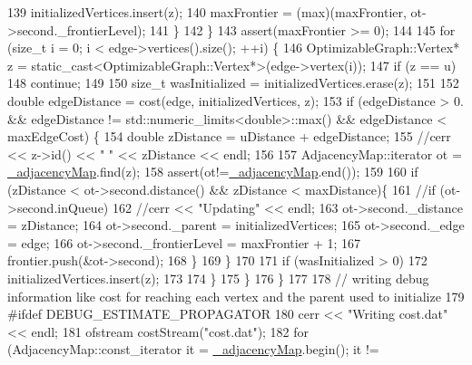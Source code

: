 \begin{DoxyCode}
139             initializedVertices.insert(z);
140             maxFrontier = (max)(maxFrontier, ot->second.\_frontierLevel);
141           \}
142         \}
143         assert(maxFrontier >= 0);
144 
145         \textcolor{keywordflow}{for} (\textcolor{keywordtype}{size\_t} i = 0; i < edge->vertices().size(); ++i) \{
146           OptimizableGraph::Vertex* z = \textcolor{keyword}{static\_cast<}OptimizableGraph::Vertex*\textcolor{keyword}{>}(edge->vertex(i));
147           \textcolor{keywordflow}{if} (z == u)
148             \textcolor{keywordflow}{continue};
149 
150           \textcolor{keywordtype}{size\_t} wasInitialized = initializedVertices.erase(z);
151 
152           \textcolor{keywordtype}{double} edgeDistance = cost(edge, initializedVertices, z);
153           \textcolor{keywordflow}{if} (edgeDistance > 0. && edgeDistance != std::numeric\_limits<double>::max() && edgeDistance < 
      maxEdgeCost) \{
154             \textcolor{keywordtype}{double} zDistance = uDistance + edgeDistance;
155             \textcolor{comment}{//cerr << z->id() << " " << zDistance << endl;}
156 
157             AdjacencyMap::iterator ot = \hyperlink{classg2o_1_1EstimatePropagator_ac3f6429938db62696444fd7ee765439a}{\_adjacencyMap}.find(z);
158             assert(ot!=\hyperlink{classg2o_1_1EstimatePropagator_ac3f6429938db62696444fd7ee765439a}{\_adjacencyMap}.end());
159 
160             \textcolor{keywordflow}{if} (zDistance < ot->second.distance() && zDistance < maxDistance)\{
161               \textcolor{comment}{//if (ot->second.inQueue)}
162                 \textcolor{comment}{//cerr << "Updating" << endl;}
163               ot->second.\_distance = zDistance;
164               ot->second.\_parent = initializedVertices;
165               ot->second.\_edge = edge;
166               ot->second.\_frontierLevel = maxFrontier + 1;
167               frontier.push(&ot->second);
168             \}
169           \}
170 
171           \textcolor{keywordflow}{if} (wasInitialized > 0)
172             initializedVertices.insert(z);
173 
174         \}
175       \}
176     \}
177 
178     \textcolor{comment}{// writing debug information like cost for reaching each vertex and the parent used to initialize}
179 \textcolor{preprocessor}{#ifdef DEBUG\_ESTIMATE\_PROPAGATOR}
180     cerr << \textcolor{stringliteral}{"Writing cost.dat"} << endl;
181     ofstream costStream(\textcolor{stringliteral}{"cost.dat"});
182     \textcolor{keywordflow}{for} (AdjacencyMap::const\_iterator it = \hyperlink{classg2o_1_1EstimatePropagator_ac3f6429938db62696444fd7ee765439a}{\_adjacencyMap}.begin(); it != 

\end{DoxyCode}
